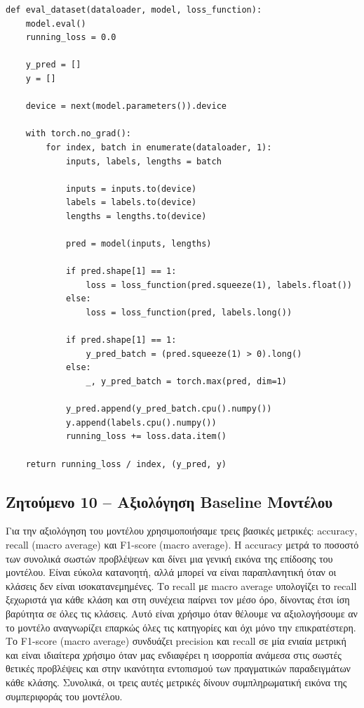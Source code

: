 \documentclass[11pt,a4paper]{article}
\begin{document}
\begin{lstlisting}[caption={Code for eval\_dataset (training.py)}]
def eval_dataset(dataloader, model, loss_function):
    model.eval()
    running_loss = 0.0

    y_pred = []
    y = []

    device = next(model.parameters()).device

    with torch.no_grad():
        for index, batch in enumerate(dataloader, 1):
            inputs, labels, lengths = batch

            inputs = inputs.to(device)
            labels = labels.to(device)
            lengths = lengths.to(device)

            pred = model(inputs, lengths)

            if pred.shape[1] == 1:
                loss = loss_function(pred.squeeze(1), labels.float())
            else:
                loss = loss_function(pred, labels.long())

            if pred.shape[1] == 1:
                y_pred_batch = (pred.squeeze(1) > 0).long()
            else:
                _, y_pred_batch = torch.max(pred, dim=1)

            y_pred.append(y_pred_batch.cpu().numpy())
            y.append(labels.cpu().numpy())
            running_loss += loss.data.item()

    return running_loss / index, (y_pred, y)
\end{lstlisting}

\subsection*{Ζητούμενο 10 -- Αξιολόγηση \textlatin{Baseline} Μοντέλου}


Για την αξιολόγηση του μοντέλου χρησιμοποιήσαμε τρεις βασικές μετρικές: \textlatin{accuracy}, \textlatin{recall (macro average)} και 
\textlatin{F1-score (macro average)}. Η \textlatin{accuracy} μετρά το ποσοστό των συνολικά σωστών προβλέψεων και δίνει μια γενική εικόνα της 
επίδοσης του μοντέλου. Είναι εύκολα κατανοητή, αλλά μπορεί να είναι παραπλανητική όταν οι κλάσεις δεν είναι ισοκατανεμημένες. Το \textlatin{recall} 
με \textlatin{macro average} υπολογίζει το \textlatin{recall} ξεχωριστά για κάθε κλάση και στη συνέχεια παίρνει τον μέσο όρο, δίνοντας έτσι 
ίση βαρύτητα σε όλες τις κλάσεις. Αυτό είναι χρήσιμο όταν θέλουμε να αξιολογήσουμε αν το μοντέλο αναγνωρίζει επαρκώς όλες τις κατηγορίες και όχι 
μόνο την επικρατέστερη. Το \textlatin{F1-score (macro average)} συνδυάζει \textlatin{precision} και \textlatin{recall} σε μία ενιαία μετρική και είναι 
ιδιαίτερα χρήσιμο όταν μας ενδιαφέρει η ισορροπία ανάμεσα στις σωστές θετικές προβλέψεις και στην ικανότητα εντοπισμού των πραγματικών παραδειγμάτων 
κάθε κλάσης. Συνολικά, οι τρεις αυτές μετρικές δίνουν συμπληρωματική εικόνα της συμπεριφοράς του μοντέλου.
\end{document}
